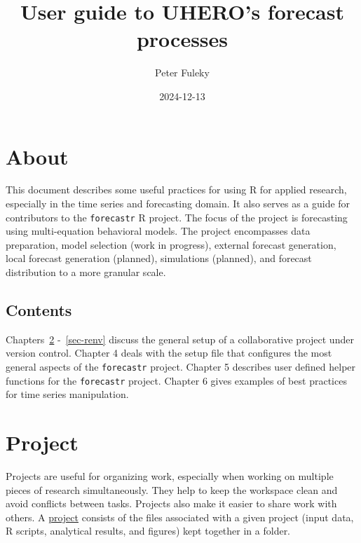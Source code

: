 \documentclass[
  letterpaper,
  DIV=11,
  numbers=noendperiod]{scrreport}
\title{User guide to UHERO's forecast processes}
\author{Peter Fuleky}
\date{2024-12-13}
\renewcommand*\contentsname{Table of contents}
\newcommand\contentsname{Table of contents}
\begin{document}
\maketitle

\renewcommand*\contentsname{Table of contents}
{
\hypersetup{linkcolor=}
\setcounter{tocdepth}{2}
\tableofcontents
}


\chapter{About}\label{about}

This document describes some useful practices for using R for applied
research, especially in the time series and forecasting domain. It also
serves as a guide for contributors to the \texttt{forecastr} R project.
The focus of the project is forecasting using multi-equation behavioral
models. The project encompasses data preparation, model selection (work
in progress), external forecast generation, local forecast generation
(planned), simulations (planned), and forecast distribution to a more
granular scale.

\section{Contents}\label{contents}

Chapters~\ref{sec-project} -~\ref{sec-renv} discuss the general setup of
a collaborative project under version control. Chapter 4 deals with the
setup file that configures the most general aspects of the
\texttt{forecastr} project. Chapter 5 describes user defined helper
functions for the \texttt{forecastr} project. Chapter 6 gives examples
of best practices for time series manipulation.


\chapter{Project}\label{sec-project}

Projects are useful for organizing work, especially when working on
multiple pieces of research simultaneously. They help to keep the
workspace clean and avoid conflicts between tasks. Projects also make it
easier to share work with others. A
\href{https://support.posit.co/hc/en-us/articles/200526207-Using-RStudio-Projects}{project}
consists of the files associated with a given project (input data, R
scripts, analytical results, and figures) kept together in a folder.
\end{document}

